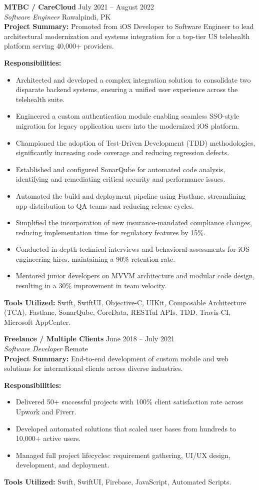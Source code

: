 \documentclass[letter,10pt]{article}
\newcommand{\role}[4]{
    \noindent\textbf{#1} \hfill #3 \\
    \textit{#2} \hfill #4 \\
}
\begin{document}
\role{MTBC / CareCloud}{Software Engineer}{July 2021 -- August 2022}{Rawalpindi, PK}
\noindent\textbf{Project Summary:} Promoted from iOS Developer to Software Engineer to lead architectural modernization and systems integration for a top-tier US telehealth platform serving 40,000+ providers.

\noindent\textbf{Responsibilities:}
\begin{itemize}[noitemsep, topsep=2pt]
    \item Architected and developed a complex integration solution to consolidate two disparate backend systems, ensuring a unified user experience across the telehealth suite.
    \item Engineered a custom authentication module enabling seamless SSO-style migration for legacy application users into the modernized iOS platform.
    \item Championed the adoption of Test-Driven Development (TDD) methodologies, significantly increasing code coverage and reducing regression defects.
    \item Established and configured SonarQube for automated code analysis, identifying and remediating critical security and performance issues.
    \item Automated the build and deployment pipeline using Fastlane, streamlining app distribution to QA teams and reducing release cycles.
    \item Simplified the incorporation of new insurance-mandated compliance changes, reducing implementation time for regulatory features by 15\%.
    \item Conducted in-depth technical interviews and behavioral assessments for iOS engineering hires, maintaining a 90\% retention rate.
    \item Mentored junior developers on MVVM architecture and modular code design, resulting in a 30\% improvement in team velocity.
\end{itemize}
\noindent\textbf{Tools Utilized:} Swift, SwiftUI, Objective-C, UIKit, Composable Architecture (TCA), Fastlane, SonarQube, CoreData, RESTful APIs, TDD, Travis-CI, Microsoft AppCenter.

\role{Freelance / Multiple Clients}{Software Developer}{June 2018 -- July 2021}{Remote}
\noindent\textbf{Project Summary:} End-to-end development of custom mobile and web solutions for international clients across diverse industries.

\noindent\textbf{Responsibilities:}
\begin{itemize}[noitemsep, topsep=2pt]
    \item Delivered 50+ successful projects with 100\% client satisfaction rate across Upwork and Fiverr.
    \item Developed automated solutions that scaled user bases from hundreds to 10,000+ active users.
    \item Managed full project lifecycles: requirement gathering, UI/UX design, development, and deployment.
\end{itemize}
\noindent\textbf{Tools Utilized:} Swift, SwiftUI, Firebase, JavaScript, Automated Scripts.
\end{document}
